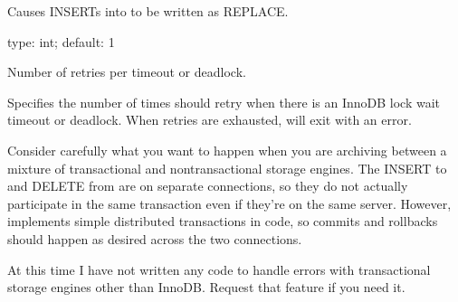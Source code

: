 \documentclass[letterpaper,10pt,english]{sphinxmanual}
\begin{document}
\begin{fulllineitems}
\label{\detokenize{mariadb-archiver:cmdoption-mariadb-archiver-replace}}
Causes INSERTs into {\hyperref[\detokenize{mariadb-archiver:cmdoption-mariadb-archiver-dest}]{}} to be written as REPLACE.

\end{fulllineitems}


\begin{fulllineitems}
\label{\detokenize{mariadb-archiver:cmdoption-mariadb-archiver-retries}}
type: int; default: 1

Number of retries per timeout or deadlock.

Specifies the number of times  should retry when there is an
InnoDB lock wait timeout or deadlock.  When retries are exhausted,
 will exit with an error.

Consider carefully what you want to happen when you are archiving between a
mixture of transactional and non\sphinxhyphen{}transactional storage engines.  The INSERT to
{\hyperref[\detokenize{mariadb-archiver:cmdoption-mariadb-archiver-dest}]{}} and DELETE from {\hyperref[\detokenize{mariadb-archiver:cmdoption-mariadb-archiver-source}]{}} are on separate connections, so they
do not actually participate in the same transaction even if they’re on the same
server.  However,  implements simple distributed transactions in
code, so commits and rollbacks should happen as desired across the two
connections.

At this time I have not written any code to handle errors with transactional
storage engines other than InnoDB.  Request that feature if you need it.

\end{fulllineitems}
\end{document}
